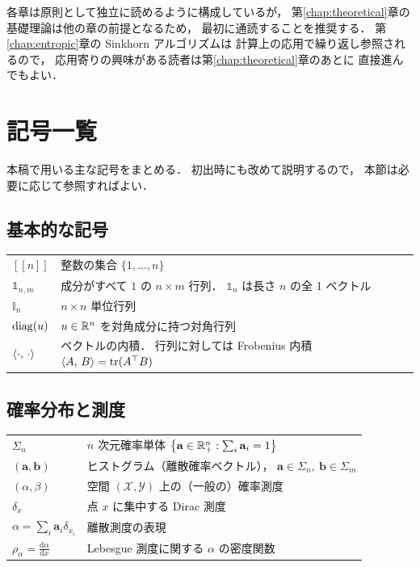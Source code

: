 \medskip

各章は原則として独立に読めるように構成しているが，
第\ref{chap:theoretical}章の基礎理論は他の章の前提となるため，
最初に通読することを推奨する．
第\ref{chap:entropic}章の Sinkhorn アルゴリズムは
計算上の応用で繰り返し参照されるので，
応用寄りの興味がある読者は第\ref{chap:theoretical}章のあとに
直接進んでもよい．


\section{記号一覧}\label{sec:notation}

本稿で用いる主な記号をまとめる．
初出時にも改めて説明するので，
本節は必要に応じて参照すればよい．

\subsection*{基本的な記号}

\begin{tabular}{lp{28em}}
  $[\![ n ]\!]$ & 整数の集合 $\{1, \ldots, n\}$ \\[3pt]
  $\mathbb{1}_{n,m}$ & 成分がすべて $1$ の $n \times m$ 行列．
    $\mathbb{1}_n$ は長さ $n$ の全 1 ベクトル \\[3pt]
  $\mathbb{I}_n$ & $n \times n$ 単位行列 \\[3pt]
  $\operatorname{diag}(u)$ & $u \in \mathbb{R}^n$ を対角成分に持つ対角行列 \\[3pt]
  $\langle \cdot,\, \cdot \rangle$ & ベクトルの内積．
    行列に対しては Frobenius 内積
    $\langle A,\, B \rangle = \operatorname{tr}(A^\top B)$
\end{tabular}

\subsection*{確率分布と測度}

\begin{tabular}{lp{28em}}
  $\Sigma_n$ & $n$ 次元確率単体
    $\bigl\{ \mathbf{a} \in \mathbb{R}^n_+ : \sum_i \mathbf{a}_i = 1 \bigr\}$ \\[3pt]
  $(\mathbf{a}, \mathbf{b})$ & ヒストグラム（離散確率ベクトル），
    $\mathbf{a} \in \Sigma_n,\ \mathbf{b} \in \Sigma_m$ \\[3pt]
  $(\alpha, \beta)$ & 空間 $(\mathcal{X}, \mathcal{Y})$ 上の（一般の）確率測度 \\[3pt]
  $\delta_x$ & 点 $x$ に集中する Dirac 測度 \\[3pt]
  $\alpha = \sum_i \mathbf{a}_i \delta_{x_i}$ & 離散測度の表現 \\[3pt]
  $\rho_\alpha = \frac{\mathrm{d}\alpha}{\mathrm{d}x}$ &
    Lebesgue 測度に関する $\alpha$ の密度関数
\end{tabular}

